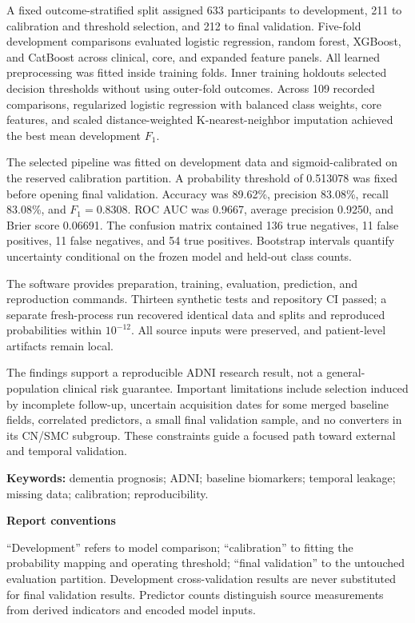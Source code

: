 \documentclass[11pt,a4paper]{article}
\begin{document}
A fixed outcome-stratified split assigned 633 participants to development, 211 to calibration and threshold selection, and 212 to final validation. Five-fold development comparisons evaluated logistic regression, random forest, XGBoost, and CatBoost across clinical, core, and expanded feature panels. All learned preprocessing was fitted inside training folds. Inner training holdouts selected decision thresholds without using outer-fold outcomes. Across 109 recorded comparisons, regularized logistic regression with balanced class weights, core features, and scaled distance-weighted K-nearest-neighbor imputation achieved the best mean development $F_1$.

The selected pipeline was fitted on development data and sigmoid-calibrated on the reserved calibration partition. A probability threshold of 0.513078 was fixed before opening final validation. Accuracy was 89.62\%, precision 83.08\%, recall 83.08\%, and $F_1=0.8308$. ROC AUC was 0.9667, average precision 0.9250, and Brier score 0.06691. The confusion matrix contained 136 true negatives, 11 false positives, 11 false negatives, and 54 true positives. Bootstrap intervals quantify uncertainty conditional on the frozen model and held-out class counts.

The software provides preparation, training, evaluation, prediction, and reproduction commands. Thirteen synthetic tests and repository CI passed; a separate fresh-process run recovered identical data and splits and reproduced probabilities within $10^{-12}$. All source inputs were preserved, and patient-level artifacts remain local.

The findings support a reproducible ADNI research result, not a general-population clinical risk guarantee. Important limitations include selection induced by incomplete follow-up, uncertain acquisition dates for some merged baseline fields, correlated predictors, a small final validation sample, and no converters in its CN/SMC subgroup. These constraints guide a focused path toward external and temporal validation.

\textbf{Keywords:} dementia prognosis; ADNI; baseline biomarkers; temporal leakage; missing data; calibration; reproducibility.

\clearpage
\tableofcontents
\vfill
\textbf{Report conventions}\par
``Development'' refers to model comparison; ``calibration'' to fitting the probability mapping and operating threshold; ``final validation'' to the untouched evaluation partition. Development cross-validation results are never substituted for final validation results. Predictor counts distinguish source measurements from derived indicators and encoded model inputs.
\end{document}
